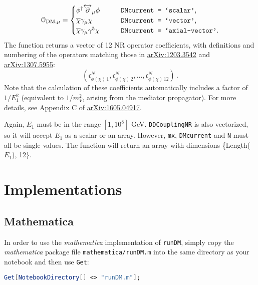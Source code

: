 \documentclass[notitlepage,12pt]{article}
\newcommand{\ourpaper}{\href{http://arxiv.org/abs/1605.04917}{arXiv:1605.04917}\xspace}
\begin{document}
\begin{equation}
\mathcal{O}_{\mathrm{DM}, \mu} = 
\begin{cases}
\phi^\dagger \overleftrightarrow{\partial}_\mu \phi & \qquad \text{\texttt{DMcurrent = `scalar'},}\\
\overline{\chi} \gamma_\mu \chi & \qquad \text{\texttt{DMcurrent = `vector'},}\\
\overline{\chi} \gamma_\mu \gamma^5 \chi & \qquad \text{\texttt{DMcurrent = `axial-vector'}.}\\
\end{cases}
\end{equation}
The function returns a vector of 12 NR operator coefficients, with definitions and numbering of the operators matching those in \href{http://arxiv.org/abs/1203.3542}{arXiv:1203.3542} and \href{http://arxiv.org/abs/1307.5955}{arXiv:1307.5955}:
\begin{equation}
\left(\mathfrak{c}_{\phi(\chi) \, 1}^{N}, \mathfrak{c}_{\phi(\chi) \, 2}^{N}, ..., \mathfrak{c}_{\phi(\chi) \, 12}^{N}\right) \,.
\end{equation}
Note that the calculation of these coefficients automatically includes a factor of $1/E_1^2$ (equivalent to $1/m_V^2$, arising from the mediator propagator). For more details, see Appendix C of \ourpaper.

Again, $E_1$ must be in the range $[1, 10^8]$ GeV. \texttt{DDCouplingNR} is also vectorized, so it will accept $E_1$ as a scalar or an array.  However, \texttt{mx}, \texttt{DMcurrent} and \texttt{N} must all be single values. The function will return an array with dimensions \{Length($E_1$), 12\}.
\section{Implementations}
\label{sec:implementations}

\subsection{Mathematica}

In order to use the \textit{mathematica} implementation of \texttt{runDM}, simply copy the \textit{mathematica} package file \texttt{mathematica/runDM.m} into the same directory as your notebook and then use \texttt{Get}:

\begin{lstlisting}[language=mathematica]
Get[NotebookDirectory[] <> "runDM.m"];
\end{lstlisting}
\end{document}
